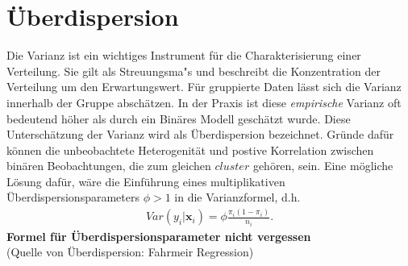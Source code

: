 \documentclass[12pt]{scrreprt}
\begin{document}
	\section{Überdispersion}
	Die Varianz ist ein wichtiges Instrument für die Charakterisierung einer Verteilung. Sie gilt als Streuungsma"s und beschreibt die Konzentration der Verteilung um den Erwartungswert. Für gruppierte Daten lässt sich die Varianz innerhalb der Gruppe abschätzen. In der Praxis ist diese \textit{empirische} Varianz oft bedeutend höher als durch ein Binäres Modell geschätzt wurde. Diese Unterschätzung der Varianz wird als Überdispersion bezeichnet. Gründe dafür können die unbeobachtete Heterogenität und postive Korrelation zwischen binären Beobachtungen, die zum gleichen $cluster$ gehören, sein. Eine mögliche Lösung dafür, wäre die Einführung eines multiplikativen Überdispersionsparameters $\phi > 1$ in die Varianzformel, d.h.
	\begin{align}
	Var(y_{i}|\textbf{x}_{i})=\phi \frac{\pi_{i}(1-\pi_{i})}{n_{i}}.
	\end{align}
	\textbf{Formel für Überdispersionsparameter nicht vergessen} \\
	(Quelle von Überdispersion: Fahrmeir Regression)
	
	
	
\end{document}
